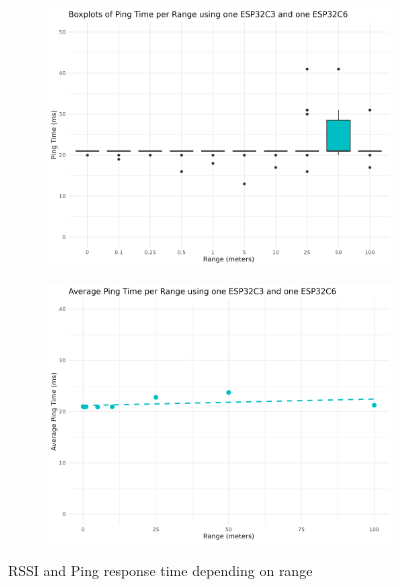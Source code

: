 \begin{figure}[H]
    \begin{subfigure}{0.45\textwidth}
        \includegraphics[width=\linewidth]{rstudio/analysis/plots/ESP32C36_ping_box.png}
    \end{subfigure}
    \begin{subfigure}{0.45\textwidth}
        \includegraphics[width=\linewidth]{rstudio/analysis/plots/ESP32C36_avg_ping.png}
    \end{subfigure}
    \vspace{\ftspace}
    \caption{RSSI and Ping response time depending on range}
    \label{fig:rssipingrange_esp32c36}
\end{figure}

